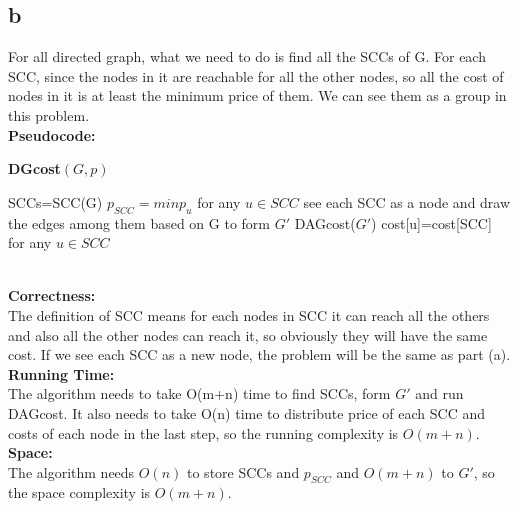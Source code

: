 \documentclass[twoside]{homework}
\begin{document}
\subsection*{b}
For all directed graph, what we need to do is find all the SCCs of G. For each SCC, since the nodes in it are reachable for all the other nodes, so all the cost of nodes in it is at least the minimum price of them. We can see them as a group in this problem.
\\\textbf{Pseudocode:} \quad
\begin{algorithm}
	\caption*{\textbf{DGcost$(G,p)$}}
	\begin{algorithmic}
		\STATE SCCs=SCC(G)
		\STATE $p_{SCC}=min{p_u}$ for any $u\in SCC$
		\ENDFOR
		\STATE see each SCC as a node and draw the edges among them based on G to form $G'$
		\STATE DAGcost($G'$)
		\STATE cost[u]=cost[SCC] for any $u\in SCC$
	\end{algorithmic}		
\end{algorithm}
\\\textbf{Correctness:} 
\\The definition of SCC means for each nodes in SCC it can reach all the others and also all the other nodes can reach it, so obviously they will have the same cost. If we see each SCC as a new node, the problem will be the same as part (a).
\\\textbf{Running Time:} \quad
\\The algorithm needs to take O(m+n) time to find SCCs, form $G'$ and run DAGcost. It also needs to take O(n) time to distribute price of each SCC and costs of each node in the last step, so the running complexity is $O(m+n)$.
\\\textbf{Space:} \quad
\\The algorithm needs $O(n)$ to store SCCs and $p_{SCC}$ and $O(m+n)$ to $G'$, so the space complexity is $O(m+n)$.
\end{document}
